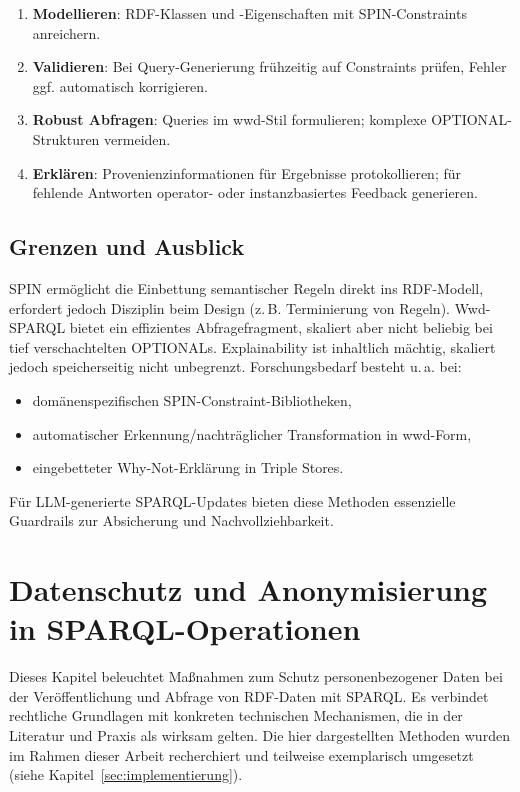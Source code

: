 \begin{enumerate}
\item \textbf{Modellieren}: RDF-Klassen und -Eigenschaften mit SPIN-Constraints anreichern.
\item \textbf{Validieren}: Bei Query-Generierung frühzeitig auf Constraints prüfen, Fehler ggf. automatisch korrigieren.
\item \textbf{Robust Abfragen}: Queries im wwd-Stil formulieren; komplexe OPTIONAL-Strukturen vermeiden.
\item \textbf{Erklären}: Provenienzinformationen für Ergebnisse protokollieren; für fehlende Antworten operator- oder instanzbasiertes Feedback generieren.
\end{enumerate}

\subsection{Grenzen und Ausblick}
SPIN ermöglicht die Einbettung semantischer Regeln direkt ins RDF-Modell, erfordert jedoch Disziplin beim Design (z.\,B. Terminierung von Regeln). Wwd-SPARQL bietet ein effizientes Abfragefragment, skaliert aber nicht beliebig bei tief verschachtelten OPTIONALs. Explainability ist inhaltlich mächtig, skaliert jedoch speicherseitig nicht unbegrenzt. Forschungsbedarf besteht u.\,a. bei:
\begin{itemize}
\item domänenspezifischen SPIN-Constraint-Bibliotheken,
\item automatischer Erkennung/nachträglicher Transformation in wwd-Form,
\item eingebetteter Why-Not-Erklärung in Triple Stores.
\end{itemize}
Für LLM-generierte SPARQL-Updates bieten diese Methoden essenzielle Guardrails zur Absicherung und Nachvollziehbarkeit.











\section{Datenschutz und Anonymisierung in SPARQL-Operationen}
\label{sec:privacy}

Dieses Kapitel beleuchtet Maßnahmen zum Schutz personenbezogener Daten bei der Veröffentlichung und Abfrage von RDF-Daten mit SPARQL. Es verbindet rechtliche Grundlagen mit konkreten technischen Mechanismen, die in der Literatur und Praxis als wirksam gelten. Die hier dargestellten Methoden wurden im Rahmen dieser Arbeit recherchiert und teilweise exemplarisch umgesetzt (siehe Kapitel~\ref{sec:implementierung}).

